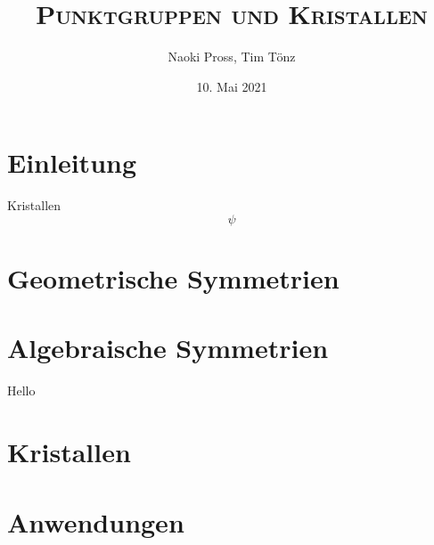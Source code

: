 \documentclass[12pt, xcolor, aspectratio=169]{beamer}
\title{\LARGE \scshape Punktgruppen und Kristallen}
\author[N. Pross, T. T\"onz]{Naoki Pross, Tim T\"onz}
\institute{Hochschule f\"ur Technik OST, Rapperswil}
\date{10. Mai 2021}
\begin{document}
\begin{frame}{}
\titlepage
\end{frame}


\section{Einleitung}
\begin{frame}{Kristallen}
\[
  \psi
\]
\end{frame}

\section{Geometrische Symmetrien}

\section{Algebraische Symmetrien}
\begin{frame}{}
  Hello
\end{frame}

\section{Kristallen}

\section{Anwendungen}
\end{document}
